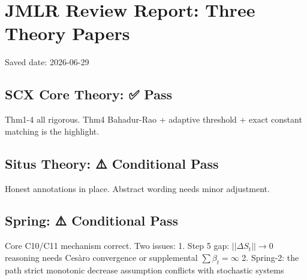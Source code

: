 \documentclass[
  12pt,
]{article}
\author{SCX}
\date{2026}
\begin{document}
\section{JMLR Review Report: Three Theory Papers}\label{jmlr-review-report-three-theory-papers}

Saved date: 2026-06-29

\subsection{SCX Core Theory: ✅ Pass}\label{scx-core-theory-pass}

Thm1-4 all rigorous. Thm4 Bahadur-Rao + adaptive threshold + exact constant matching is the highlight.

\subsection{Situs Theory: ⚠️ Conditional Pass}\label{situs-theory-conditional-pass}

Honest annotations in place. Abstract wording needs minor adjustment.

\subsection{Spring: ⚠️ Conditional Pass}\label{spring-conditional-pass}

Core C10/C11 mechanism correct. Two issues:
1. Step 5 gap: \(||\Delta S_t|| \to 0\) reasoning needs Ces\`{a}ro
convergence or supplemental \(\sum\beta_t = \infty\)
2. Spring-2: the path strict monotonic decrease assumption conflicts with stochastic systems
\end{document}
